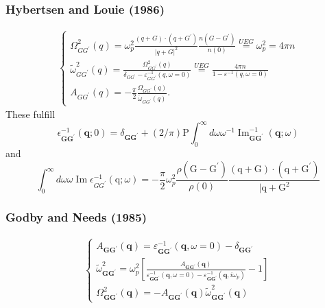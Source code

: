 \begin{frame}
\frametitle{Hybertsen and Louie (1986)}
\begin{align}
   \left\{\begin{array}{l}\Omega_{G G^{\prime}}^2(q)=\omega_p^2 \frac{(q+G) \cdot\left(q+G^{\prime}\right)}{|q+G|^2} \frac{n\left(G-G^{\prime}\right)}{n(0)}\overset{UEG}{=}\omega _p^2 = 4\pi n \\ \tilde{\omega}_{G G^{\prime}}^2(q)=\frac{\Omega_{G G^{\prime}}^2(q)}{\delta_{G G^{\prime}}-\varepsilon_{G G^{\prime}}^{-1}(q, \omega=0)} \overset{UEG}{=} \frac{4\pi n}{1-\varepsilon^{-1}(q, \omega=0)}
\\ A_{G G^{\prime}}(q)=-\frac{\pi}{2} \frac{\Omega_{G G^{\prime}}(q)}{\tilde{\omega}_{G G^{\prime}}(q)} .\end{array}\right. 
\end{align}
\pause
These fulfill
\begin{equation}
    \epsilon_{\mathbf{G G}^{\prime}}^{-1}(\mathbf{q} ; 0) = \delta_{\mathbf{G G}^{\prime}} + (2/\pi) \mathrm{P} \int_0^{\infty} d \omega \omega^{-1} \operatorname{Im}_{\mathbf{G G}^{\prime}}^{-1}(\mathbf{q} ; \omega)
\end{equation}
\pause
and
\begin{equation}
    \int_0^{\infty} d \omega \omega \operatorname{Im} \epsilon_{G G^{\prime}}^{-1}(\mathrm{q} ; \omega) = -\frac{\pi}{2} \omega_p^2 \frac{\rho\left(\mathrm{G}-\mathrm{G}^{\prime}\right)}{\rho(0)} \frac{(\mathrm{q}+\mathrm{G}) \cdot\left(\mathrm{q}+\mathrm{G}^{\prime}\right)}{\mid \mathrm{q}+\mathrm{G}^2}
\end{equation}
\end{frame}
\begin{frame}
\frametitle{Godby and Needs (1985)}
\begin{align}
    \left\{\begin{array}{l}
A_{\boldsymbol{G} \boldsymbol{G}^{\prime}}(\boldsymbol{q})=\varepsilon_{\boldsymbol{G} \boldsymbol{G}^{\prime}}^{-1}(\boldsymbol{q}, \omega=0)-\delta_{\boldsymbol{G} \boldsymbol{G}^{\prime}} \\
\tilde{\omega}_{\boldsymbol{G} \boldsymbol{G}^{\prime}}^2=\omega_p^2\left[\frac{A_{\boldsymbol{G} \boldsymbol{G}^{\prime}}(\boldsymbol{q})}{\varepsilon_{\boldsymbol{G} \boldsymbol{G}^{\prime}}^{-1}(\boldsymbol{q}, \omega=0)-\varepsilon_{\boldsymbol{G} \boldsymbol{G}^{\prime}}^{-1}\left(\boldsymbol{q}, i \omega_p\right)}-1\right] \\
\Omega_{\boldsymbol{G} \boldsymbol{G}^{\prime}}^2(\boldsymbol{q})=-A_{\boldsymbol{G} \boldsymbol{G}^{\prime}}(\boldsymbol{q}) \tilde{\omega}_{\boldsymbol{G} \boldsymbol{G}^{\prime}}^2(\boldsymbol{q})
\end{array}\right.
\end{align}
\end{frame}
